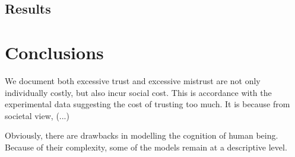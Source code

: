 \documentclass[11pt]{article}
\begin{document}
\subsection{Results}

\section{Conclusions}

We document both excessive trust and excessive mistrust are not only individually costly, but also incur social cost. This is accordance with the experimental data suggesting the cost of trusting too much. It is because from societal view, (...)

Obviously, there are drawbacks in modelling the cognition of human being. Because of their complexity, some of the models remain at a descriptive level. 
\end{document}
